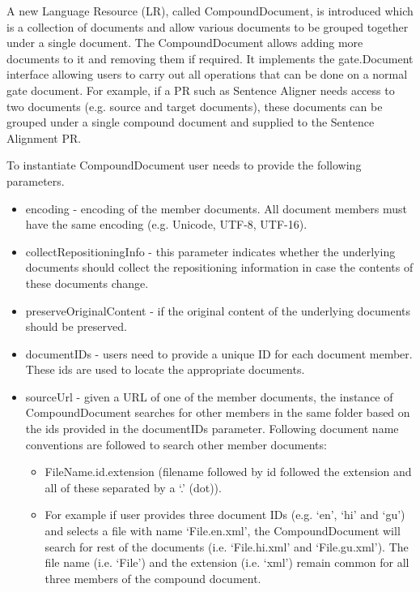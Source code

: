 
A new Language Resource (LR), called CompoundDocument, is introduced which
is a collection of documents and allow various documents to be grouped together
under a single document.  The CompoundDocument allows adding more documents to
it and removing them if required. It implements the gate.Document interface
allowing users to carry out all operations that can be done on a normal gate
document.  For example, if a PR such as Sentence Aligner needs access to two
documents (e.g. source and target documents), these documents can be grouped 
under a single compound document and supplied to the Sentence Alignment PR.

To instantiate CompoundDocument user needs to provide the following parameters.
\begin{itemize}
\item encoding - encoding of the member documents. All document members must
have the same encoding (e.g. Unicode, UTF-8, UTF-16). 
\item collectRepositioningInfo - this parameter indicates whether the underlying
documents should collect the repositioning information in case the contents of
these documents change.
\item preserveOriginalContent - if the original content of the underlying
documents should be preserved.
\item documentIDs - users need to provide a unique ID for each document member.
These ids are used to locate the appropriate documents.
\item sourceUrl - given a URL of one of the member documents, the instance of
CompoundDocument searches for other members in the same folder based on the ids
provided in the documentIDs parameter. Following document name conventions are
followed to search other member documents:
\begin{itemize}
\item FileName.id.extension (filename followed by id followed the extension and
all of these separated by a `.' (dot)).
\item For example if user provides three document IDs (e.g. `en', `hi' and `gu')
and selects a file with name `File.en.xml', the CompoundDocument will search for
rest of the documents (i.e. `File.hi.xml' and `File.gu.xml').  The file name
(i.e. `File') and the extension (i.e. `xml') remain common for all three members
of the compound document.
\end{itemize}
\end{itemize}


